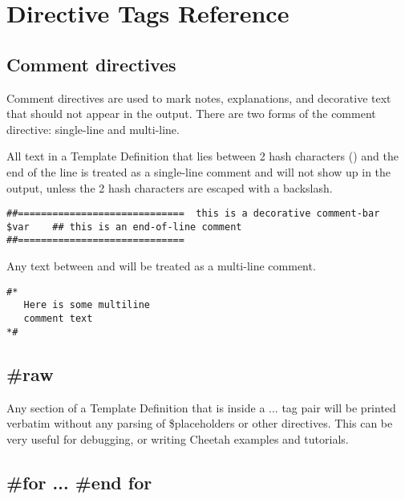 \section{Directive Tags Reference}
\label{directives}

\subsection{Comment directives}
\label{directives.comments}

Comment directives are used to mark notes, explanations, and decorative text
that should not appear in the output.  There are two forms of the comment
directive: single-line and multi-line.

All text in a Template Definition that lies between 2 hash characters
(\code{\#\#}) and the end of the line is treated as a single-line comment and
will not show up in the output, unless the 2 hash characters are escaped with a
backslash.
\begin{verbatim}
##=============================  this is a decorative comment-bar
$var    ## this is an end-of-line comment
##=============================
\end{verbatim}

Any text between \code{\#*} and \code{*\#} will be treated as a multi-line
comment.
\begin{verbatim}
#*
   Here is some multiline
   comment text
*#
\end{verbatim}

\subsection{\#raw}
\label{directives.raw}

Any section of a Template Definition that is inside a  ...
 tag pair will be printed verbatim without any parsing of
\$placeholders or other directives.  This can be very useful for debugging, or
writing Cheetah examples and tutorials.


\subsection{\#for ... \#end for}
\label{directives.for}

